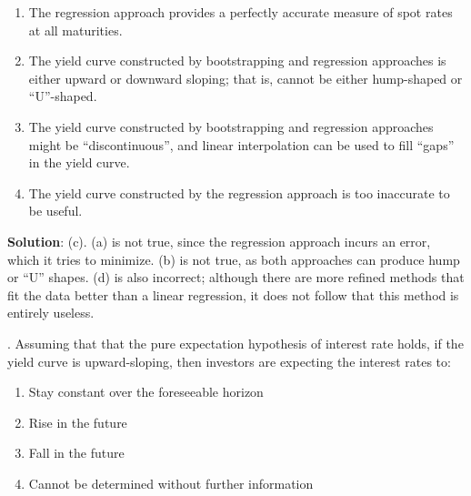 \documentclass[11.5pt]{article}
\begin{document}
\begin{enumerate}[a]
	
	\item The regression approach provides a perfectly accurate measure of spot rates at all maturities.
	
	\item The yield curve constructed by bootstrapping and regression approaches is either upward or downward sloping; that is, cannot be either hump-shaped or “U”-shaped.
	
	\item The yield curve constructed by bootstrapping and regression approaches might be “discontinuous”, and linear interpolation can be used to fill “gaps” in the yield curve.
	
	\item The yield curve constructed by the regression approach is too inaccurate to be useful.
\end{enumerate}



\noindent \textbf{Solution}: (c).  (a) is not true, since the regression approach incurs an error, which it tries to minimize. (b) is not true, as both approaches can produce hump or “U” shapes. (d) is also incorrect; although there are more refined methods that fit the data better than a linear regression, it does not follow that this method is entirely useless.

\vspace{30pt}



\newpage



. Assuming that that the pure expectation hypothesis of interest rate holds, if the yield curve is upward-sloping, then investors are expecting the interest rates to:

\begin{enumerate}[a]
	
	\item Stay constant over the foreseeable horizon
	
	\item Rise in the future
	
	\item Fall in the future
	
	\item Cannot be determined without further information
\end{enumerate}
\end{document}

